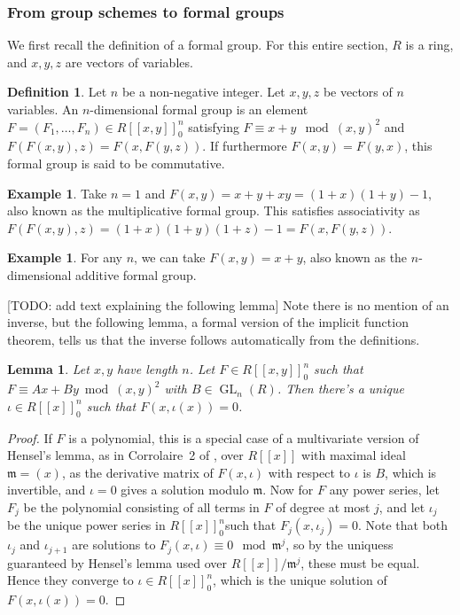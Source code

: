 \documentclass[12pt]{article}
\newcommand{\m}{\mathfrak{m}}
\DeclareMathOperator{\GL}{GL}
\theoremstyle{plain}
\newtheorem{lem}[thm]{Lemma} %
\theoremstyle{definition}
\newtheorem{defn}[thm]{Definition} %
\newtheorem{exmp}[thm]{Example} %
\theoremstyle{remark}
\begin{document}
\subsubsection{From group schemes to formal groups}
We first recall the definition of a formal group. For this entire section, $R$ is a ring, and $x,y,z$ are vectors of variables.
\begin{defn}
\label{defn:formalgroup}
Let $n$ be a non-negative integer. Let $x,y,z$ be vectors of $n$ variables. An $n$-dimensional formal group is an element $F = (F_1,\dots,F_n) \in R[[x,y]]_0^n$ satisfying $F \equiv x + y \mod (x,y)^2$ and $F(F(x,y),z) = F(x,F(y,z))$. If furthermore $F(x,y) = F(y,x)$, this formal group is said to be commutative.
\end{defn}
\begin{exmp}
\label{exmp:gmformalgroup}
Take $n=1$ and $F(x,y) = x + y + xy = (1+x)(1+y)-1$, also known as the multiplicative formal group. This satisfies associativity as $F(F(x,y),z) = (1+x)(1+y)(1+z)-1 = F(x,F(y,z))$.
\end{exmp}
\begin{exmp}
\label{exmp:ganformalgroup}
For any $n$, we can take $F(x,y) = x+ y$, also known as the $n$-dimensional additive formal group.
\end{exmp}
[TODO: add text explaining the following lemma]
Note there is no mention of an inverse, but the following lemma, a formal version of the implicit function theorem, tells us that the inverse follows automatically from the definitions.
\begin{lem}
\label{lem:implicitfunction}
Let $x,y$ have length $n$. Let $F \in R[[x,y]]_0^n$ such that $F \equiv Ax + By \bmod (x,y)^2$ with $B \in \GL_n(R)$. Then there's a unique $\iota \in R[[x]]_0^n$ such that $F(x,\iota(x)) = 0$. 
\end{lem}
\begin{proof}
If $F$ is a polynomial, this is a special case of a multivariate version of Hensel's lemma, as in Corrolaire~2 of \cite[III,4.5]{BourbakiCA}, over $R[[x]]$ with maximal ideal $\m = (x)$, as the derivative matrix of $F(x,\iota)$ with respect to $\iota$ is $B$, which is invertible, and $\iota = 0$ gives a solution modulo $\m$. Now for $F$ any power series, let $F_j$ be the polynomial consisting of all terms in $F$ of degree at most $j$, and let $\iota_j$ be the unique power series in $R[[x]]_0^n$such that $F_j(x,\iota_j) = 0$. Note that both $\iota_j$ and $\iota_{j+1}$ are solutions to $F_j(x,\iota) \equiv 0 \mod \m^j$, so by the uniquess guaranteed by Hensel's lemma used over $R[[x]]/\m^j$, these must be equal. Hence they converge to $\iota \in R[[x]]_0^n$, which is the unique solution of $F(x,\iota(x)) = 0$.
\end{proof}
\end{document}
